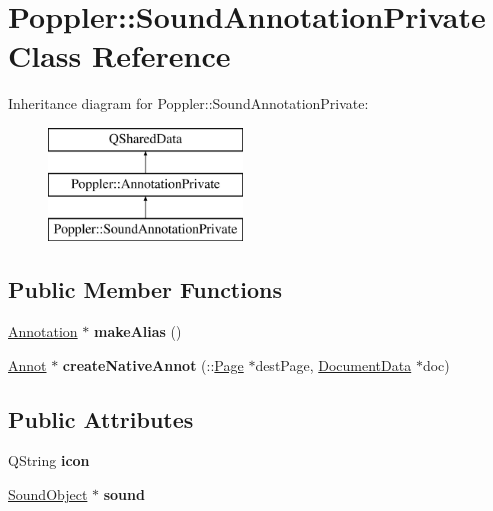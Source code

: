 \hypertarget{class_poppler_1_1_sound_annotation_private}{}\section{Poppler\+:\+:Sound\+Annotation\+Private Class Reference}
\label{class_poppler_1_1_sound_annotation_private}
Inheritance diagram for Poppler\+:\+:Sound\+Annotation\+Private\+:\begin{figure}[H]
\begin{center}
\leavevmode
\includegraphics[height=3.000000cm]{class_poppler_1_1_sound_annotation_private}
\end{center}
\end{figure}
\subsection*{Public Member Functions}
\begin{DoxyCompactItemize}
\item 
\mbox{\label{class_poppler_1_1_sound_annotation_private_a76dd810a16349beaacfbc3266915a2e1}} 
\hyperlink{class_poppler_1_1_annotation}{Annotation} $\ast$ {\bfseries make\+Alias} ()
\item 
\mbox{\label{class_poppler_1_1_sound_annotation_private_a4c8c285f4b2f6e0db40e6960fd785710}} 
\hyperlink{class_annot}{Annot} $\ast$ {\bfseries create\+Native\+Annot} (\+::\hyperlink{class_poppler_1_1_page}{Page} $\ast$dest\+Page, \hyperlink{class_poppler_1_1_document_data}{Document\+Data} $\ast$doc)
\end{DoxyCompactItemize}
\subsection*{Public Attributes}
\begin{DoxyCompactItemize}
\item 
\mbox{\label{class_poppler_1_1_sound_annotation_private_a5a08c50881ff74e5baec3c91b3de9427}} 
Q\+String {\bfseries icon}
\item 
\mbox{\label{class_poppler_1_1_sound_annotation_private_a3f14a2a7ff9f0e2db8e19f3797ee95c4}} 
\hyperlink{class_poppler_1_1_sound_object}{Sound\+Object} $\ast$ {\bfseries sound}
\end{DoxyCompactItemize}
